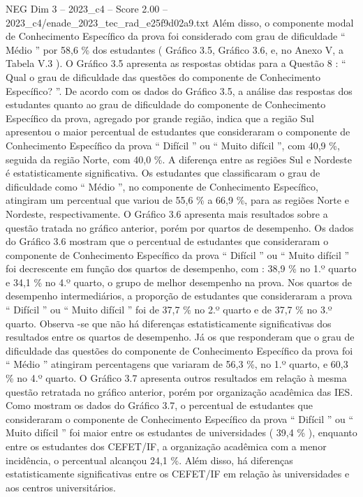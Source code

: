 \begin{textsample}{NEG Dim 3 – 2023\_c4 – Score 2.00 – 2023\_c4/enade\_2023\_tec\_rad\_e25f9d02a9.txt}
Além disso, o componente modal de Conhecimento Específico da prova foi considerado com grau de dificuldade “ Médio ” por 58,6 \% dos estudantes ( Gráfico 3.5, Gráfico 3.6, e, no Anexo V, a Tabela V.3 ).
O Gráfico 3.5 apresenta as respostas obtidas para a Questão 8 : “ Qual o grau de dificuldade das questões do componente de Conhecimento Específico? ”.
De acordo com os dados do Gráfico 3.5, a análise das respostas dos estudantes quanto ao grau de dificuldade do componente de Conhecimento Específico da prova, agregado por grande região, indica que a região Sul apresentou o maior percentual de estudantes que consideraram o componente de Conhecimento Específico da prova “ Difícil ” ou “ Muito difícil ”, com 40,9 \%, seguida da região Norte, com 40,0 \%.
A diferença entre as regiões Sul e Nordeste é estatisticamente significativa.
Os estudantes que classificaram o grau de dificuldade como “ Médio ”, no componente de Conhecimento Específico, atingiram um percentual que variou de 55,6 \% a 66,9 \%, para as regiões Norte e Nordeste, respectivamente.
O Gráfico 3.6 apresenta mais resultados sobre a questão tratada no gráfico anterior, porém por quartos de desempenho.
Os dados do Gráfico 3.6 mostram que o percentual de estudantes que consideraram o componente de Conhecimento Específico da prova “ Difícil ” ou “ Muito difícil ” foi decrescente em função dos quartos de desempenho, com : 38,9 \% no 1.º quarto e 34,1 \% no 4.º quarto, o grupo de melhor desempenho na prova.
Nos quartos de desempenho intermediários, a proporção de estudantes que consideraram a prova “ Difícil ” ou “ Muito difícil ” foi de 37,7 \% no 2.º quarto e de 37,7 \% no 3.º quarto.
Observa -se que não há diferenças estatisticamente significativas dos resultados entre os quartos de desempenho.
Já os que responderam que o grau de dificuldade das questões do componente de Conhecimento Específico da prova foi “ Médio ” atingiram percentagens que variaram de 56,3 \%, no 1.º quarto, e 60,3 \% no 4.º quarto.
O Gráfico 3.7 apresenta outros resultados em relação à mesma questão retratada no gráfico anterior, porém por organização acadêmica das IES.
Como mostram os dados do Gráfico 3.7, o percentual de estudantes que consideraram o componente de Conhecimento Específico da prova “ Difícil ” ou “ Muito difícil ” foi maior entre os estudantes de universidades ( 39,4 \% ), enquanto entre os estudantes dos CEFET/IF, a organização acadêmica com a menor incidência, o percentual alcançou 24,1 \%.
Além disso, há diferenças estatisticamente significativas entre os CEFET/IF em relação às universidades e aos centros universitários.

\end{textsample}
